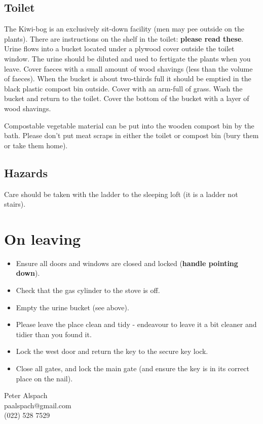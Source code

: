 \documentclass[12pt]{article} %
\begin{document}
  \subsection{Toilet}
    The Kiwi-bog is an exclusively sit-down facility (men may pee outside on the plants).  There are instructions on the shelf in the toilet: \textbf{please read these}.  Urine flows into a bucket located under a plywood cover outside the toilet window.  The urine should be diluted and used to fertigate the plants when you leave.  Cover faeces with a
    small amount of wood shavings (less than the volume of faeces).  When the bucket is
    about two-thirds full it should be emptied in the black plastic compost bin
    outside.  Cover with an arm-full of grass.  Wash the bucket and
    return to the toilet.  Cover the bottom of the bucket with a
    layer of wood shavings.

    Compostable vegetable material can be put into the wooden compost bin by the bath.  Please don't put meat scraps in either the toilet or compost bin
    (bury them or take them home).

  \subsection{Hazards}
    Care should be taken with the ladder to the sleeping
    loft (it is a ladder not stairs).

  \section{On leaving}
  \begin{itemize}
    \item Ensure all doors and windows are closed and locked (\textbf{handle pointing down}).
    \item Check that the gas cylinder to the stove is off.
    \item Empty the urine bucket (see above).
    \item Please leave the place clean and tidy - endeavour to leave
    it a bit cleaner and tidier than you found it.
    \item Lock the west door and return the key to the secure key lock.
    \item Close all gates, and lock the main gate (and ensure the key
      is in its correct place on the nail).
  \end{itemize}


\bigskip
Peter Alspach\\paalspach@gmail.com\\(022) 528 7529
\end{document}

